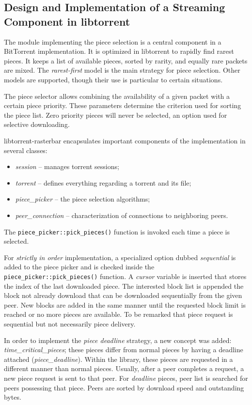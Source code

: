 \subsection{Design and Implementation of a Streaming Component in libtorrent}
\label{subsec:multimedia-dist:libtorrent-design}

The module implementing the piece selection is a central component in a
BitTorrent implementation. It is optimized in libtorrent to rapidly find
rarest pieces. It keeps a list of available pieces, sorted by rarity, and
equally rare packets are mixed. The \textit{rarest-first} model is the main
strategy for piece selection. Other models are supported, though their use is
particular to certain situations.

The piece selector allows combining the availability of a given packet with a
certain piece priority. These parameters determine the criterion used for
sorting the piece list. Zero priority pieces will never be selected, an option
used for selective downloading.

libtorrent-rasterbar encapsulates important components of the implementation
in several classes:
\begin{itemize}
  \item \textit{session} -- manages torrent sessions;
  \item \textit{torrent} -- defines everything regarding a torrent and its
  file;
  \item \textit{piece\_picker} -- the piece selection algorithms;
  \item \textit{peer\_connection} -- characterization of connections to
  neighboring peers.
\end{itemize}

The \texttt{piece\_picker::pick\_pieces()} function is invoked each time a
piece is selected.

For \textit{strictly in order} implementation, a specialized option dubbed
\textit{sequential} is added to the piece picker and is checked inside the
\texttt{piece\_picker::pick\_pieces()} function. A \textit{cursor} variable is
inserted that stores the index of the last downloaded piece. The interested
block list is appended the block not already download that can be downloaded
sequentially from the given peer. New blocks are added in the same manner
until the requested block limit is reached or no more pieces are available. To
be remarked that piece request is sequential but not necessarily piece
delivery.

In order to implement the \textit{piece deadline} strategy, a new concept was
added: \textit{time\_critical\_pieces}; these pieces differ from normal pieces
by having a deadline attached (\textit{piece\_deadline}). Within the library,
these pieces are requested in a different manner than normal pieces. Usually,
after a peer completes a request, a new piece request is sent to that peer.
For \textit{deadline} pieces, peer list is searched for peers possessing that
piece. Peers are sorted by download speed and outstanding bytes.

